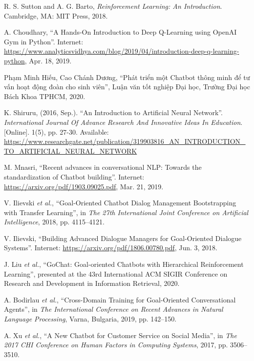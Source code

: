 \begin{thebibliography}{99}
R. S. Sutton and A. G. Barto, \textit{Reinforcement Learning: An Introduction}.
Cambridge, MA: MIT Press, 2018.

A. Choudhary, \enquote{A Hands-On Introduction to Deep Q-Learning using OpenAI Gym in Python}.
Internet: \url{https://www.analyticsvidhya.com/blog/2019/04/introduction-deep-q-learning-python}, Apr. 18, 2019.

Phạm Minh Hiếu, Cao Chánh Dương, \enquote{Phát triển một Chatbot thông minh để tư vấn hoạt động đoàn cho sinh viên},
Luận văn tốt nghiệp Đại học, Trường Đại học Bách Khoa TPHCM, 2020.

K. Shiruru, (2016, Sep.). \enquote{An Introduction to Artificial Neural Network}.
\textit{International Journal Of Advance Research And Innovative Ideas In Education}.
[Online]. 1(5), pp. 27-30.
Available: \url{https://www.researchgate.net/publication/319903816_AN_INTRODUCTION_TO_ARTIFICIAL_NEURAL_NETWORK}

M. Mnasri, \enquote{Recent advances in conversational NLP: Towards the standardization of Chatbot building}.
Internet: \url{https://arxiv.org/pdf/1903.09025.pdf}, Mar. 21, 2019.

V. Ilievski \textit{et al.}, \enquote{Goal-Oriented Chatbot Dialog Management Bootstrapping with Transfer Learning},
in \textit{The 27th International Joint Conference on Artificial Intelligence}, 2018, pp. 4115–4121.

V. Ilievski, \enquote{Building Advanced Dialogue Managers for Goal-Oriented Dialogue Systems}.
Internet: \url{https://arxiv.org/pdf/1806.00780.pdf}, Jun. 3, 2018.

J. Liu \textit{et al.}, \enquote{GoChat: Goal-oriented Chatbots with Hierarchical Reinforcement Learning},
presented at the 43rd International ACM SIGIR Conference on Research and Development in Information Retrieval, 2020.

A. Bodirlau \textit{et al.}, \enquote{Cross-Domain Training for Goal-Oriented Conversational Agents},
in \textit{The International Conference on Recent Advances in Natural Language Processing}, Varna, Bulgaria, 2019, pp. 142–150.

A. Xu \textit{et al.}, \enquote{A New Chatbot for Customer Service on Social Media},
in \textit{The 2017 CHI Conference on Human Factors in Computing Systems}, 2017, pp. 3506–3510.


\end{thebibliography}
